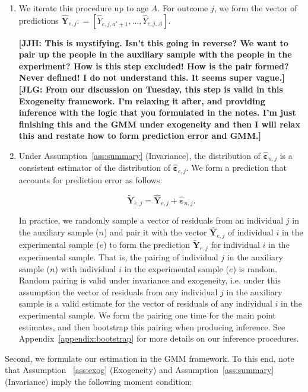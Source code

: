 \begin{enumerate}
\item We iterate this procedure up to age $A$. For outcome $j$, we form the vector of predictions $\hat{\bm{Y}}_{e,j} : = \left[ \hat{Y}_{e,j,a^*+1}, \ldots,  \hat{Y}_{e,j,A} \right]$.

\noindent \textbf{[JJH: This is mystifying. Isn't this going in reverse? We want to pair up the people in the auxiliary sample with the people in the experiment? How is this step excluded! How is the pair formed? Never defined! I do not understand this. It seems super vague.] [JLG: From our discussion on Tuesday, this step is valid in this Exogeneity framework. I'm relaxing it after, and providing inference with the logic that you formulated in the notes. I'm just finishing this and the GMM under exogeneity and then I will relax  this and restate how to form prediction error and GMM.]}

\item Under Assumption~\ref{ass:summary} (Invariance), the distribution of $\hat{\bm{\varepsilon}}_{n,j}$ is a consistent estimator of the distribution of $\hat{\bm{\varepsilon}}_{e,j}$. We form a prediction that accounts for prediction error as follows:

\begin{equation}
\tilde{\bm{Y}}_{e,j} = \hat{\bm{Y}}_{e,j} + \hat{\bm{\varepsilon}}_{n,j}.
\end{equation}

\noindent In practice, we randomly sample a vector of residuals from an individual $j$ in the auxiliary sample ($n$) and pair it with the vector $\hat{\bm{Y}}_{e,j}$ of individual $i$ in the experimental sample ($e$) to form the prediction $\tilde{\bm{Y}}_{e,j}$ for individual $i$ in the experimental sample. That is, the pairing of individual $j$ in the auxiliary sample ($n$) with individual $i$ in the experimental sample ($e$) is random. Random pairing is valid under invariance and exogeneity, i.e. under this assumption the vector of residuals from any individual $j$ in the auxiliary sample is a valid estimate for the vector of residuals of any individual $i$ in the experimental sample. We form the pairing one time for the main point estimates, and then bootstrap this pairing when producing inference. See Appendix~\ref{appendix:bootstrap} for more details on our inference procedures.
\end{enumerate}

\noindent Second, we formulate our estimation in the GMM framework. To this end, note that Assumption ~\ref{ass:exog} (Exogeneity) and Assumption~\ref{ass:summary} (Invariance) imply the following moment condition:

